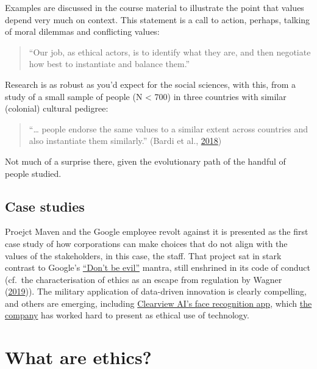 \documentclass[
]{book}
\begin{document}
Examples are discussed in the course material to illustrate the point that values depend very much on context. This statement is a call to action, perhaps, talking of moral dilemmas and conflicting values:

\begin{quote}
``Our job, as ethical actors, is to identify what they are, and then negotiate how best to instantiate and balance them.''
\end{quote}

Research is as robust as you'd expect for the social sciences, with this, from a study of a small sample of people (N \textless{} 700) in three countries with similar (colonial) cultural pedigree:

\begin{quote}
``\ldots{} people endorse the same values to a similar extent across countries and also instantiate them similarly.'' (Bardi et al., \protect\hyperlink{ref-Bardi2018}{2018})
\end{quote}

Not much of a surprise there, given the evolutionary path of the handful of people studied.

\hypertarget{case-studies}{%
\subsection{Case studies}\label{case-studies}}

Proejct Maven and the Google employee revolt against it is presented as the first case study of how corporations can make choices that do not align with the values of the stakeholders, in this case, the staff. That project sat in stark contrast to Google's \href{https://en.wikipedia.org/wiki/Don\%27t_be_evil}{``Don't be evil''} mantra, still enshrined in its code of conduct (cf.~the characterisation of ethics as an escape from regulation by Wagner (\protect\hyperlink{ref-Hildebrandt2019}{2019})). The military application of data-driven innovation is clearly compelling, and others are emerging, including \href{https://www.nytimes.com/2020/01/18/technology/clearview-privacy-facial-recognition.html}{Clearview AI's face recognition app}, which \href{https://clearview.ai/}{the company} has worked hard to present as ethical use of technology.

\hypertarget{what-are-ethics}{%
\section{What are ethics?}\label{what-are-ethics}}
\end{document}
